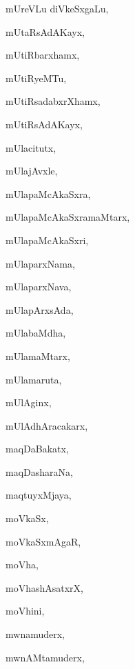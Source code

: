 \begin{multicols}{3}
{\noindent
{mUreVLu diVkeSx\-gaLu}, \pageref{mUreVLu diVkeSxgaLu}

\noindent
{mUtaRsAdAKayx}, \pageref{mUtaRsAdAKayx}

\noindent
{mUtiRbarxhamx}, \pageref{mUtiRbarxhamx}

\noindent
{mUtiRyeMTu}, \pageref{mUtiRyeMTu}

\noindent
{mUtiRsadabxrXhamx}, \pageref{mUtiRsadabxrXhamx}

\noindent
{mUtiRsAdAKayx}, \pageref{mUtiRsAdAKayx}

\noindent
{mUlacitutx}, \pageref{mUlacitutx}

\noindent
{mUlajAvxle}, \pageref{mUlajAvxle}

\noindent
{mUlapaMcAkaSxra}, \pageref{mUlapaMcAkaSxra}

\noindent
{mUlapaMcAkaSxramaMtarx}, \pageref{mUlapaMcAkaSxramaMtarx}

\noindent
{mUlapaMcAkaSxri}, \pageref{mUlapaMcAkaSxri}

\noindent
{mUlaparxNama}, \pageref{mUlaparxNama}

\noindent
{mUlaparxNava}, \pageref{mUlaparxNava}

\noindent
{mUlapArxsAda}, \pageref{mUlapArxsAda}

\noindent
{mUlabaMdha}, \pageref{mUlabaMdha}

\noindent
{mUlamaMtarx}, \pageref{mUlamaMtarx}

\noindent
{mUlamaruta}, \pageref{mUlamaruta}

\noindent
{mUlAginx}, \pageref{mUlAginx}

\noindent
{mUlAdhAracakarx}, \pageref{mUlAdhAracakarx}

\noindent
{maqDaBakatx}, \pageref{maqDaBakatx}

\noindent
{maqDasharaNa}, \pageref{maqDasharaNa}

\noindent
{maqtuyxMjaya}, \pageref{maqtuyxMjaya}

\noindent
{moVkaSx}, \pageref{moVkaSx}

\noindent
{moVkaSxmAgaR}, \pageref{moVkaSxmAgaR}

\noindent
{moVha}, \pageref{moVha}

\noindent
{moVhashAsatxrX}, \pageref{moVhashAsatxrX}

\noindent
{moVhini}, \pageref{moVhini}

\noindent
{mwnamuderx}, \pageref{mwnamuderx}

\noindent
{mwnAMtamuderx}, \pageref{mwnAMtamuderx}

}
\end{multicols}
